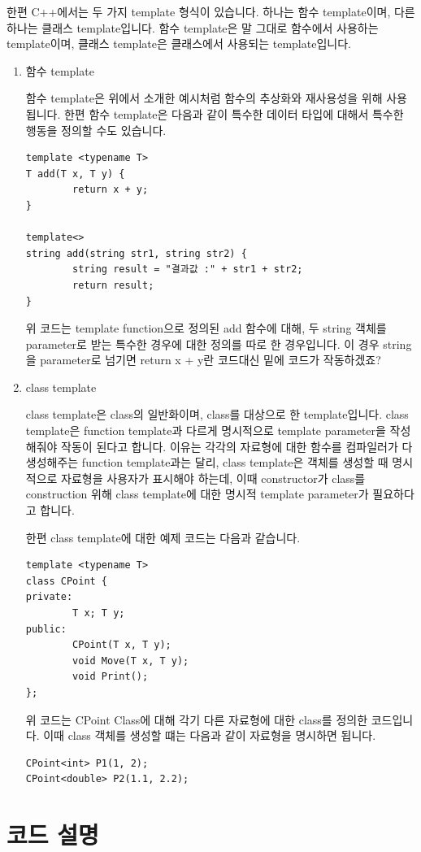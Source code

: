 \documentclass{article}
\begin{document}
한편 C++에서는 두 가지 template 형식이 있습니다. 하나는 함수 template이며, 다른 하나는 클래스 template입니다. 함수 template은 말 그대로 함수에서 사용하는 template이며, 클래스 template은 클래스에서 사용되는 template입니다.
\begin{enumerate}
    \item 함수 template
    
    함수 template은 위에서 소개한 예시처럼 함수의 추상화와 재사용성을 위해 사용됩니다. 한편 함수 template은 다음과 같이 특수한 데이터 타입에 대해서 특수한 행동을 정의할 수도 있습니다.
    \begin{verbatim}
template <typename T>
T add(T x, T y) {
	    return x + y;   
}

template<>
string add(string str1, string str2) {
    	string result = "결과값 :" + str1 + str2;
    	return result;
}
    \end{verbatim}
    위 코드는 template function으로 정의된 add 함수에 대해, 두 string 객체를 parameter로 받는 특수한 경우에 대한 정의를 따로 한 경우입니다. 이 경우 string을 parameter로 넘기면 return x + y란 코드대신 밑에 코드가 작동하겠죠?
    
    \item class template
    
    class template은 class의 일반화이며, class를 대상으로 한 template입니다. class template은 function template과 다르게 명시적으로 template parameter을 작성해줘야 작동이 된다고 합니다. 이유는 각각의 자료형에 대한 함수를 컴파일러가 다 생성해주는 function template과는 달리, class template은 객체를 생성할 때 명시적으로 자료형을 사용자가 표시해야 하는데, 이때 constructor가 class를 construction 위해 class template에 대한 명시적 template parameter가 필요하다고 합니다.
    
    한편 class template에 대한 예제 코드는 다음과 같습니다.
    \begin{verbatim}
template <typename T>
class CPoint {
private:
    	T x; T y;
public:
    	CPoint(T x, T y);
    	void Move(T x, T y);
    	void Print();
};
    \end{verbatim}
    위 코드는 CPoint Class에 대해 각기 다른 자료형에 대한 class를 정의한 코드입니다. 이때 class 객체를 생성할 떄는 다음과 같이 자료형을 명시하면 됩니다.
    \begin{verbatim}
CPoint<int> P1(1, 2);
CPoint<double> P2(1.1, 2.2);
    \end{verbatim}
\end{enumerate}

\section{코드 설명}
\end{document}
